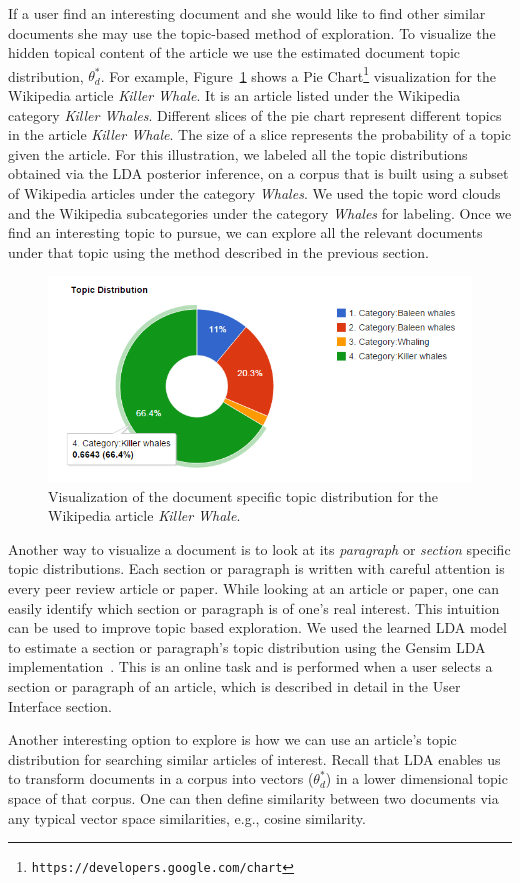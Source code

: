 If a user find an interesting document and she would like to
find other similar documents she may use the topic-based method of exploration.
To visualize the hidden topical content of the article we use the 
estimated document topic distribution, $\theta^*_{d}$.
For example, Figure~\ref{fig:doc-topic-distribution} shows a Pie 
Chart\footnote{\texttt{https://developers.google.com/chart}} 
visualization for the Wikipedia article \textit{Killer Whale}.
It is an article listed under the Wikipedia category          
\textit{Killer Whales}. Different slices of the pie chart represent
different topics in the article \textit{Killer Whale}. The size 
of a slice represents the probability of a topic given the article. 
For this illustration, we labeled all the topic 
distributions obtained via the LDA posterior inference, on a 
corpus that is built using a subset of Wikipedia articles under the 
category \textit{Whales}. We used the topic word clouds 
and the Wikipedia subcategories under the category \textit{Whales} 
for labeling. Once we find an interesting topic to pursue, we can 
explore all the relevant documents under that topic using the 
method described in the previous section. 

\begin{figure}[htb]\centering 
\includegraphics[width=.45\textwidth]{images/doc_topic_distribution.png}
\caption{Visualization of the document specific topic distribution 
for the Wikipedia article \textit{Killer Whale}.}
\label{fig:doc-topic-distribution}
\end{figure}

Another way to visualize a document is to look at its 
\textsl{paragraph} or \textsl{section} specific topic distributions. 
Each section or paragraph is written with careful attention is every 
peer review article or paper. While looking at an article or paper,  
one can easily identify which section or paragraph is of one's real 
interest. This intuition can be used to improve topic based 
exploration. We used the learned LDA model to 
estimate a section or paragraph's topic distribution using the
Gensim LDA implementation~\cite{rehurek_lrec}. This is an 
online task and is performed when a user selects a section or 
paragraph of an article, which is described in detail in the \system 
User Interface section.


Another interesting option to explore is how we can use an article's 
topic distribution for searching similar articles of interest. 
Recall that LDA enables us to transform documents in a corpus into 
vectors ($\theta^*_{d}$) in a lower dimensional topic space 
of that corpus. One can then define similarity between two documents 
via any typical vector space similarities, e.g., cosine similarity. 

